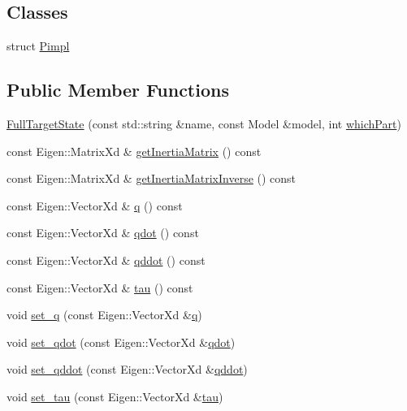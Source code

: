 \subsection*{Classes}
\begin{DoxyCompactItemize}
\item 
struct \hyperlink{structocra_1_1FullTargetState_1_1Pimpl}{Pimpl}
\end{DoxyCompactItemize}
\subsection*{Public Member Functions}
\begin{DoxyCompactItemize}
\item 
\hyperlink{classocra_1_1FullTargetState_a8164de6021f986fb82022b2fed1e0402}{Full\+Target\+State} (const std\+::string \&name, const Model \&model, int \hyperlink{classocra_1_1FullState_a75ec7c039df8cb8608ebf34f7b779be5}{which\+Part})
\item 
const Eigen\+::\+Matrix\+Xd \& \hyperlink{classocra_1_1FullTargetState_ad7a1b06462ba3cc348e5634e1a0db0b2}{get\+Inertia\+Matrix} () const
\item 
const Eigen\+::\+Matrix\+Xd \& \hyperlink{classocra_1_1FullTargetState_a55194b2f5683696eeee538cb93f3403a}{get\+Inertia\+Matrix\+Inverse} () const
\item 
const Eigen\+::\+Vector\+Xd \& \hyperlink{classocra_1_1FullTargetState_a0f246232828d53c497924b95d2b97004}{q} () const
\item 
const Eigen\+::\+Vector\+Xd \& \hyperlink{classocra_1_1FullTargetState_a2ada581270803a39e8c690f8c9354644}{qdot} () const
\item 
const Eigen\+::\+Vector\+Xd \& \hyperlink{classocra_1_1FullTargetState_a1436b42b01d2857e4dc5c53a233f0e69}{qddot} () const
\item 
const Eigen\+::\+Vector\+Xd \& \hyperlink{classocra_1_1FullTargetState_a56855f5d42e84f456a89fd259c4b7edb}{tau} () const
\item 
void \hyperlink{classocra_1_1FullTargetState_a902f4f9662d53b930073cab837ab7835}{set\+\_\+q} (const Eigen\+::\+Vector\+Xd \&\hyperlink{classocra_1_1FullTargetState_a0f246232828d53c497924b95d2b97004}{q})
\item 
void \hyperlink{classocra_1_1FullTargetState_afdaa12a27a353e3aca61212fa1313c5b}{set\+\_\+qdot} (const Eigen\+::\+Vector\+Xd \&\hyperlink{classocra_1_1FullTargetState_a2ada581270803a39e8c690f8c9354644}{qdot})
\item 
void \hyperlink{classocra_1_1FullTargetState_a462f462af7480759f251cc2087c747e7}{set\+\_\+qddot} (const Eigen\+::\+Vector\+Xd \&\hyperlink{classocra_1_1FullTargetState_a1436b42b01d2857e4dc5c53a233f0e69}{qddot})
\item 
void \hyperlink{classocra_1_1FullTargetState_a351cd0cf06d81362558128b0d8d4149a}{set\+\_\+tau} (const Eigen\+::\+Vector\+Xd \&\hyperlink{classocra_1_1FullTargetState_a56855f5d42e84f456a89fd259c4b7edb}{tau})
\end{DoxyCompactItemize}
